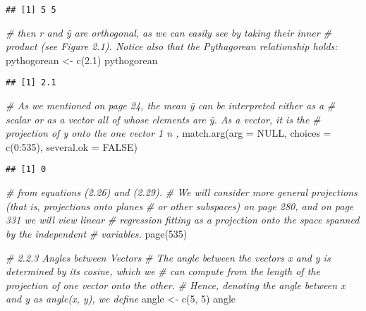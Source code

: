 \documentclass[
]{article}
\newenvironment{Shaded}{\begin{snugshade}}{\end{snugshade}}
\newcommand{\AttributeTok}[1]{\textcolor[rgb]{0.77,0.63,0.00}{#1}}
\newcommand{\CommentTok}[1]{\textcolor[rgb]{0.56,0.35,0.01}{\textit{#1}}}
\newcommand{\ConstantTok}[1]{\textcolor[rgb]{0.00,0.00,0.00}{#1}}
\newcommand{\DecValTok}[1]{\textcolor[rgb]{0.00,0.00,0.81}{#1}}
\newcommand{\FloatTok}[1]{\textcolor[rgb]{0.00,0.00,0.81}{#1}}
\newcommand{\FunctionTok}[1]{\textcolor[rgb]{0.00,0.00,0.00}{#1}}
\newcommand{\NormalTok}[1]{#1}
\newcommand{\OtherTok}[1]{\textcolor[rgb]{0.56,0.35,0.01}{#1}}
\newcommand{\SpecialCharTok}[1]{\textcolor[rgb]{0.00,0.00,0.00}{#1}}
\begin{document}
\begin{verbatim}
## [1] 5 5
\end{verbatim}

\begin{Shaded}
\begin{Highlighting}[]
\CommentTok{\# then r and ŷ are orthogonal, as we can easily see by taking their inner }
\CommentTok{\# product (see Figure 2.1). Notice also that the Pythagorean relationship holds:}
\NormalTok{pythogorean }\OtherTok{\textless{}{-}} \FunctionTok{c}\NormalTok{(}\FloatTok{2.1}\NormalTok{)}
\NormalTok{pythogorean}
\end{Highlighting}
\end{Shaded}

\begin{verbatim}
## [1] 2.1
\end{verbatim}

\begin{Shaded}
\begin{Highlighting}[]
\CommentTok{\# As we mentioned on page 24, the mean ȳ can be interpreted either as a}
\CommentTok{\# scalar or as a vector all of whose elements are ȳ. As a vector, it is the }
\CommentTok{\# projection of y onto the one vector 1 n ,}
\FunctionTok{match.arg}\NormalTok{(}\AttributeTok{arg =} \ConstantTok{NULL}\NormalTok{, }\AttributeTok{choices =} \FunctionTok{c}\NormalTok{(}\DecValTok{0}\SpecialCharTok{:}\DecValTok{535}\NormalTok{), }\AttributeTok{several.ok =} \ConstantTok{FALSE}\NormalTok{)}
\end{Highlighting}
\end{Shaded}

\begin{verbatim}
## [1] 0
\end{verbatim}

\begin{Shaded}
\begin{Highlighting}[]
\CommentTok{\# from equations (2.26) and (2.29).}
\CommentTok{\# We will consider more general projections (that is, projections onto planes}
\CommentTok{\# or other subspaces) on page 280, and on page 331 we will view linear }
\CommentTok{\# regression ﬁtting as a projection onto the space spanned by the independent }
\CommentTok{\# variables.}
\FunctionTok{page}\NormalTok{(}\DecValTok{535}\NormalTok{)}

\CommentTok{\# 2.2.3 Angles between Vectors}
\CommentTok{\# The angle between the vectors x and y is determined by its cosine, which we}
\CommentTok{\# can compute from the length of the projection of one vector onto the other.}
\CommentTok{\# Hence, denoting the angle between x and y as angle(x, y), we deﬁne}
\NormalTok{angle }\OtherTok{\textless{}{-}} \FunctionTok{c}\NormalTok{(}\DecValTok{5}\NormalTok{, }\DecValTok{5}\NormalTok{)}
\NormalTok{angle}
\end{Highlighting}
\end{Shaded}
\end{document}
